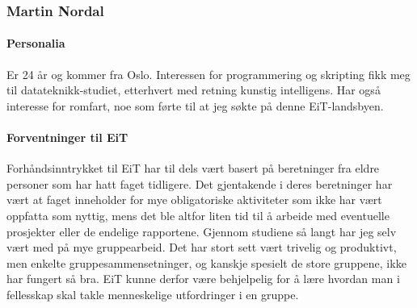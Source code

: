 \subsubsection*{Martin Nordal}

\paragraph{Personalia}
Er 24 år og kommer fra Oslo.
Interessen for programmering og skripting fikk meg til datateknikk-studiet, etterhvert med retning kunstig intelligens.
Har også interesse for romfart, noe som førte til at jeg søkte på denne EiT-landsbyen.

\paragraph{Forventninger til EiT}
Forhåndsinntrykket til EiT har til dels vært basert på beretninger fra eldre personer som har hatt faget tidligere.
Det gjentakende i deres beretninger har vært at faget inneholder for mye obligatoriske aktiviteter som ikke har vært oppfatta som nyttig, mens det ble altfor liten tid til å arbeide med eventuelle prosjekter eller de endelige rapportene.
Gjennom studiene så langt har jeg selv vært med på mye gruppearbeid.
Det har stort sett vært trivelig og produktivt, men enkelte gruppesammensetninger, og kanskje spesielt de store gruppene, ikke har fungert så bra.
EiT kunne derfor være behjelpelig for å lære hvordan man i fellesskap skal takle menneskelige utfordringer i en gruppe.